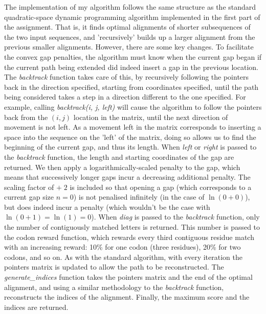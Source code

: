 \documentclass[a4paper]{article}
\begin{document}
The implementation of my algorithm follows the same structure as the standard quadratic-space dynamic programming algorithm implemented in the first part of the assignment. That is, it finds optimal alignments of shorter subsequences of the two input sequences, and 'recursively' builds up a larger alignment from the previous smaller alignments. However, there are some key changes. To facilitate the convex gap penalties, the algorithm must know when the current gap began if the current path being extended did indeed insert a gap in the previous location. The \textit{backtrack} function takes care of this, by recursively following the pointers back in the direction specified, starting from coordinates specified, until the path being considered takes a step in a direction different to the one specified. For example, calling \textit{backtrack(i, j, left)} will cause the algorithm to follow the pointers back from the $(i, j)$ location in the matrix, until the next direction of movement is not left. As a movement left in the matrix corresponds to inserting a space into the sequence on the 'left' of the matrix, doing so allows us to find the beginning of the current gap, and thus its length. When \textit{left} or \textit{right} is passed to the \textit{backtrack} function, the length and starting coordinates of the gap are returned. We then apply a logarithmically-scaled penalty to the gap, which means that successively longer gaps incur a decreasing additional penalty. The scaling factor of $+\;2$ is included so that opening a gap (which corresponds to a current gap size $n = 0$) is not penalised infinitely (in the case of $\ln(0 + 0)$), but does indeed incur a penalty (which wouldn't be the case with $\ln(0 + 1) = \ln(1) = 0$). When \textit{diag} is passed to the \textit{backtrack} function, only the number of contiguously matched letters is returned. This number is passed to the codon reward function, which rewards every third contiguous residue match with an increasing reward: 10\% for one codon (three residues), 20\% for two codons, and so on. As with the standard algorithm, with every iteration the pointers matrix is updated to allow the path to be reconstructed. The \textit{generate\_indices} function takes the pointers matrix and the end of the optimal alignment, and using a similar methodology to the \textit{backtrack} function, reconstructs the indices of the alignment. Finally, the maximum score and the indices are returned. 
\restoregeometry
\end{document}

